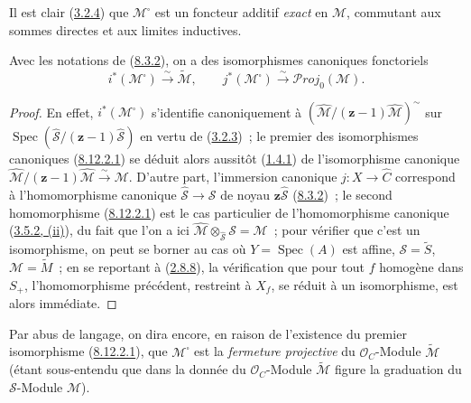 \begin{env}[8.12.1]
Il est clair (\hyperref[II.3.2.4-fr]{3.2.4}) que
$\mathcal{M}^{\square}$ est un foncteur additif \emph{exact} en $\mathcal{M}$,
commutant aux sommes directes et aux limites inductives.
\end{env}

\begin{proposition}[8.12.2]
\label{II.8.12.2-fr}
Avec les notations de \textup{(\hyperref[II.8.3.2-fr]{8.3.2})}, on a des
isomorphismes canoniques fonctoriels
\begin{equation}
\label{II.8.12.2.1-fr}
  i^*(\mathcal{M}^{\square})\xrightarrow{\sim}\widetilde{\mathcal{M}},
  \qquad
  j^*(\mathcal{M}^{\square})\xrightarrow{\sim}
  \mathcal{P}\mathit{roj}_0(\mathcal{M}).
\tag{8.12.2.1}
\end{equation}
\end{proposition}

\begin{proof}
En effet, $i^*(\mathcal{M}^{\square})$ s'identifie canoniquement à
$\left(\widehat{\mathcal{M}}/(\mathbf{z}-1)\widehat{\mathcal{M}}\right)^{\sim}$
sur
$\operatorname{Spec}(\widehat{\mathcal{S}}/(\mathbf{z}-1)\widehat{\mathcal{S}})$
en vertu de (\hyperref[II.3.2.3-fr]{3.2.3})~; le premier des isomorphismes
canoniques (\hyperref[II.8.12.2.1-fr]{8.12.2.1}) se déduit alors aussitôt
(\hyperref[II.1.4.1-fr]{1.4.1}) de l'isomorphisme canonique
$\widehat{\mathcal{M}}/(\mathbf{z}-1)\widehat{\mathcal{M}}
\xrightarrow{\sim}\mathcal{M}$. D'autre part, l'immersion canonique
$j:X\to\widehat{C}$ correspond à l'homomorphisme canonique
$\widehat{\mathcal{S}}\to\mathcal{S}$ de noyau
$\mathbf{z}\widehat{\mathcal{S}}$ (\hyperref[II.8.3.2-fr]{8.3.2})~; le second
homomorphisme (\hyperref[II.8.12.2.1-fr]{8.12.2.1}) est le cas particulier
de l'homomorphisme canonique (\hyperref[II.3.5.2-fr]{3.5.2, (ii)}), du fait
que l'on a ici
$\widehat{\mathcal{M}}\otimes_{\widehat{\mathcal{S}}}\mathcal{S}
=\mathcal{M}$~; pour vérifier que c'est un isomorphisme, on peut se borner au
cas où $Y=\operatorname{Spec}(A)$ est affine,
$\mathcal{S}=\widetilde{S}$, $\mathcal{M}=\widetilde{M}$~; en se reportant à
(\hyperref[II.2.8.8-fr]{2.8.8}), la vérification que pour tout $f$ homogène
dans $S_+$, l'homomorphisme précédent, restreint à $X_f$, se réduit à un
isomorphisme, est alors immédiate.
\end{proof}

Par abus de langage, on dira encore, en raison de l'existence du premier
isomorphisme (\hyperref[II.8.12.2.1-fr]{8.12.2.1}), que
$\mathcal{M}^{\square}$ est la \emph{fermeture projective} du
$\mathcal{O}_C$-Module $\widetilde{\mathcal{M}}$ (étant sous-entendu que dans
la donnée du $\mathcal{O}_C$-Module $\widetilde{\mathcal{M}}$ figure la
graduation du $\mathcal{S}$-Module $\mathcal{M}$).

